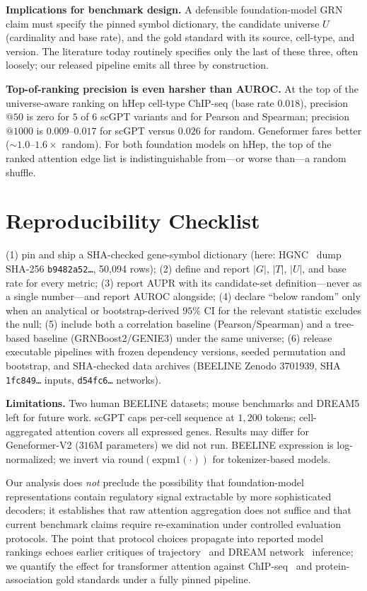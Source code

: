 \documentclass[sigconf, nonacm, anonymous]{acmart}
\begin{document}
\textbf{Implications for benchmark design.}
A defensible foundation-model GRN claim must specify the pinned
symbol dictionary, the candidate universe $U$ (cardinality and base
rate), and the gold standard with its source, cell-type, and version.
The literature today routinely specifies only the last of these
three, often loosely; our released pipeline emits all three by
construction.

\textbf{Top-of-ranking precision is even harsher than AUROC.}
At the top of the universe-aware ranking on hHep cell-type ChIP-seq
(base rate $0.018$), precision$@50$ is zero for $5$ of $6$ scGPT
variants and for Pearson and Spearman; precision$@1000$ is
$0.009$--$0.017$ for scGPT versus $0.026$ for random. Geneformer
fares better ($\sim$$1.0$--$1.6\times$ random). For both foundation
models on hHep, the top of the ranked attention edge list is
indistinguishable from---or worse than---a random shuffle.

\section{Reproducibility Checklist}

(1) pin and ship a SHA-checked gene-symbol dictionary
(here: HGNC~\cite{tweedie2021hgnc} dump SHA-256
\texttt{b9482a52\ldots}, 50{,}094 rows);
(2) define and report $|G|$, $|T|$, $|U|$, and base rate for every
metric;
(3) report AUPR with its candidate-set definition---never as a single
number---and report AUROC alongside;
(4) declare ``below random'' only when an analytical or
bootstrap-derived $95\%$ CI for the relevant statistic excludes the
null;
(5) include both a correlation baseline (Pearson/Spearman) and a
tree-based baseline (GRNBoost2/GENIE3) under the same universe;
(6) release executable pipelines with frozen dependency versions,
seeded permutation and bootstrap, and SHA-checked data archives
(BEELINE Zenodo 3701939, SHA \texttt{1fc849\ldots} inputs,
\texttt{d54fc6\ldots} networks).

\textbf{Limitations.} Two human BEELINE datasets; mouse benchmarks
and DREAM5 left for future work. scGPT caps per-cell sequence at
$1{,}200$ tokens; cell-aggregated attention covers all expressed
genes. Results may differ for Geneformer-V2 ($316$M parameters) we
did not run. BEELINE expression is log-normalized; we invert via
$\mathrm{round}(\mathrm{expm1}(\cdot))$ for tokenizer-based models.

Our analysis does \emph{not} preclude the possibility that
foundation-model representations contain regulatory signal extractable
by more sophisticated decoders; it establishes that raw attention
aggregation does not suffice and that current benchmark claims require
re-examination under controlled evaluation protocols. The point that
protocol choices propagate into reported model rankings echoes earlier
critiques of trajectory~\cite{saelens2019} and DREAM
network~\cite{marbach2012} inference; we quantify the effect for
transformer attention against ChIP-seq~\cite{encode2018,pratapa2020}
and protein-association gold standards under a fully pinned pipeline.
\end{document}

